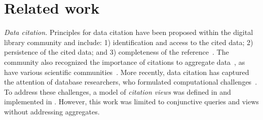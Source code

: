 \section{Related work}\label{Sec: related_work}

{\em Data citation.} Principles for data citation have been proposed within the digital library community\cite{CODATA2013,FORCE11_2104} 
and include: 1) identification and access to the cited data; 2) persistence of the cited data; and 3) completeness of the reference~\cite{Klump2015,Simons12,BraseSL15,DataCite2016}. 
The community also recognized the importance of citations to aggregate data~\cite{CODATA2013}, as have various scientific communities~\cite{harrow2012gencode, himmelstein2017systematic, mcentyre2015biostudies}. 
More recently, data citation has captured the attention of database researchers, who formulated computational challenges~\cite{BunemanEtAl2016, DBLP:conf/pods/DavidsonBDMS17}.
To address these challenges, a model of {\em citation views} was defined in \cite{davidson2017model} and implemented in \cite{alawini2017automating,wu2018data}.  However, this work was limited to conjunctive queries and views without addressing aggregates. 



